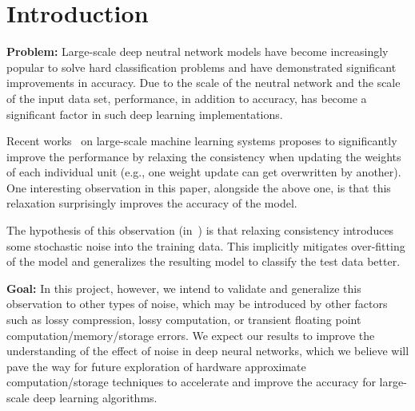 \section{Introduction}
\label{sec:intro}


{\bf Problem:}
Large-scale deep neutral network models have become increasingly popular
to solve hard classification problems and have demonstrated significant
improvements in accuracy. Due to the scale of the neutral network and the
scale of the input data set, performance, in addition to accuracy, has
become a significant factor in such deep learning implementations.

Recent works~\cite{dean2012large, chilimbi14adam} on large-scale machine
learning systems proposes to significantly improve the performance by relaxing
the consistency when updating the weights of each individual unit (e.g., one
weight update can get overwritten by another). One interesting observation in
this paper, alongside the above one, is that this relaxation surprisingly
improves the accuracy of the model.

The hypothesis of this observation (in~\cite{chilimbi14adam}) is that relaxing
consistency introduces some stochastic noise into the training data. This
implicitly mitigates over-fitting of the model and generalizes the resulting
model to classify the test data better.

{\bf Goal:}
In this project, however, we intend to validate and generalize this observation
to other types of noise, which may be introduced by other factors such as lossy
compression, lossy computation, or transient floating point
computation/memory/storage errors. We expect our results to improve the
understanding of the effect of noise in deep neural networks, which we believe
will pave the way for future exploration of hardware approximate
computation/storage techniques to accelerate and improve the accuracy for
large-scale deep learning algorithms.

